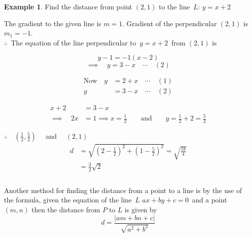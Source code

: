 \documentclass[11pt,a4paper]{article}
\theoremstyle{definition}
\newtheorem{example}[thm]{Example}
\begin{document}
\begin{example}

Find the distance from point $(2,1)$ to the line $\, L :\, y = x + 2$

\begin{figure}[H]
\centering
{}
\end{figure}













The gradient to the given line is $m = 1$. Gradient of the perpendicular $(2,1)$ is $m_1 = -1$.\\

$\therefore\,$ The equation of the line perpendicular to $\, y = x + 2\,$ from $(2,1)$ is
  
$$y - 1 = -1(x -2)$$
$$\implies \quad  y = 3 - x \quad \cdots\quad  (2)$$

\begin{align*}
\text{Now}\quad  y & = 2 + x \quad \cdots \quad  (1)\\
y & = 3 - x \quad \cdots \quad  (2)
\end{align*}


\begin{align*}
x + 2 & = 3 - x\\
\implies\quad  2x & = 1 \implies x = \frac{1}{2}\qquad \text{and}\qquad  y = \frac{1}{2} + 2 = \frac{5}{2}
\end{align*}


$\therefore\quad  \left(\frac{1}{2},\frac{5}{2}\right)\quad $ and $\quad  (2,1)$
\begin{align*}
d & = \sqrt{\left(2 - \frac{1}{2}\right)^2 + \left(1 - \frac{5}{2}\right)^2} = \sqrt{\frac{18}{4}}\\
& = \frac{3}{2}\sqrt{2}\\\\
\end{align*}






Another method for finding the distance from a point to a line is by the use of the formula, given the equation of the line \,$L\,\, ax + by + c = 0$\,
and a point $(m,n)$ then the distance from $P$ to $L$ is given by $$ d = \frac{
\left|am + bn + c\right|
}{\sqrt{a^2 + b^2}}$$
\end{example}
\end{document}
